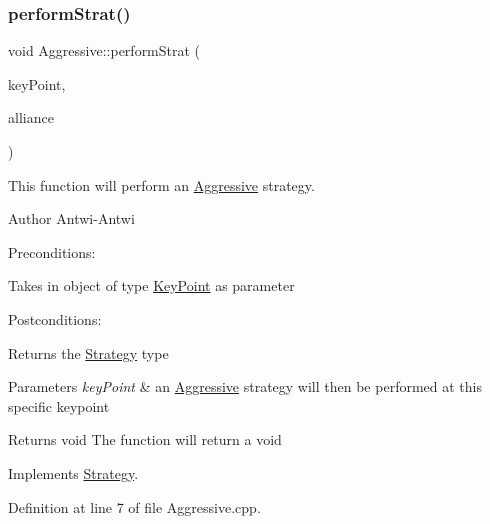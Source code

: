 \subsubsection{\texorpdfstring{perform\+Strat()}{performStrat()}}
{\footnotesize\ttfamily void Aggressive\+::perform\+Strat (\begin{DoxyParamCaption}\item[{\hyperlink{classKeyPoint}{Key\+Point} $\ast$}]{key\+Point,  }\item[{\hyperlink{classAlliance}{Alliance} $\ast$}]{alliance }\end{DoxyParamCaption})\hspace{0.3cm}{\ttfamily [virtual]}}



This function will perform an \hyperlink{classAggressive}{Aggressive} strategy. 

\begin{DoxyAuthor}{Author}
Antwi-\/\+Antwi
\end{DoxyAuthor}
Preconditions\+:
\begin{DoxyItemize}
\item Takes in object of type \hyperlink{classKeyPoint}{Key\+Point} as parameter
\end{DoxyItemize}

Postconditions\+:
\begin{DoxyItemize}
\item Returns the \hyperlink{classStrategy}{Strategy} type
\end{DoxyItemize}


\begin{DoxyParams}{Parameters}
{\em key\+Point} & an \hyperlink{classAggressive}{Aggressive} strategy will then be performed at this specific keypoint\\
\hline
\end{DoxyParams}
\begin{DoxyReturn}{Returns}
void The function will return a void 
\end{DoxyReturn}


Implements \hyperlink{classStrategy_aa0692005cb67d0ee2441046f6b302e7d}{Strategy}.



Definition at line 7 of file Aggressive.\+cpp.


